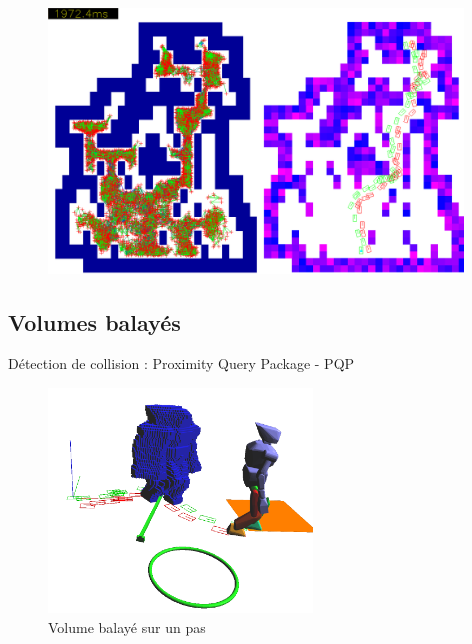 \documentclass{beamer}
\begin{document}
\begin{frame}

  \begin{figure}
    \includegraphics[width=11cm]{./images/RRT.png}
  \end{figure}
\end{frame}

\subsection{Volumes balayés}

\begin{frame}
  \begin{center}
    Détection de collision : Proximity Query Package - PQP
    \begin{figure}
      \includegraphics[width=7cm]{./images/SV.png}
      \caption{Volume balayé sur un pas}
    \end{figure}
  \end{center}
\end{frame}
\end{document}
